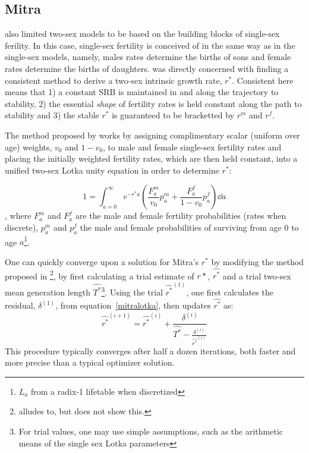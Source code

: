 \subsection{Mitra}

\citet{mitra1978derivation} also limited two-sex models to be based on the
building blocks of single-sex ferility. In this case, single-sex fertility is
conceived of in the same way as in the single-sex models, namely, males rates
determine the births of sons and female rates determine the births of daughters.
was directly concerned with finding a consistent method to derive a two-sex intrinsic growth rate, $r^\ast$. Consistent here means that 1) a constant SRB is maintained in and along the trajectory to stability, 2) the essential \textit{shape} of fertility rates is held constant along the path to stability and 3) the stable $r^\ast$ is guaranteed to be bracketted by $r^m$ and $r^f$.

The method proposed by \citet{mitra1978derivation} works by assigning
complimentary scalar (uniform over age) weights, $v_0$ and $1 - v_0$, to male
and female single-sex fertility rates and placing the initially weighted
fertility rates, which are then held constant, into a unified two-sex Lotka
unity equation in order to determine $r^\ast$:

\begin{equation}
\label{mitralotka}
1 = \int _{a=0} ^\infty e^{-r^\ast a} \left(\frac{F_a ^m}{v_0} p_a^m  +
\frac{F_a ^f}{1 - v_0} p_a^f\right) \dd a
\end{equation}
, where $F_a ^m$ and $F_a ^f$ are the male and female fertility probabilities
(rates when discrete), $p_a^m$ and $p_a^f$ the male and female probabilities of
surviving from age $0$ to age $a$\footnote{$L_a$ from a radix-1 lifetable when
discretized}.

One can quickly converge upon a solution for Mitra's $r^\ast$ by modifying the
method proposed in \citet{coale1957new}\footnote{\citet{mitra1978derivation} alludes
to, but does not show this.}, by first calculating a trial estimate of $r\ast$,
$\widehat{r^\ast}$ and a trial two-sex mean generation length
$\widehat{T^\ast}$\footnote{For trial values, one may use simple
assumptions, such as the arithmetic means of the single sex Lotka parameters}.
Using the trial $\widehat{r^\ast}^{(1)}$, one first calculates the residual, 
$\delta ^{(1)}$, from equation~\eqref{mitralotka}, then updates $\widehat{r^\ast}$ as:
\begin{equation}
\widehat{r^\ast}^{(i+1)} = \widehat{r^\ast}^{(i)} + \frac{\delta
^{(i)}}{\widehat{T^\ast} -
\frac{\delta ^{(i)}}{\widehat{r^\ast}^{(i)} }}
\end{equation}
This procedure typically converges after half a dozen iterations, both faster
and more precise than a typical optimizer solution.

